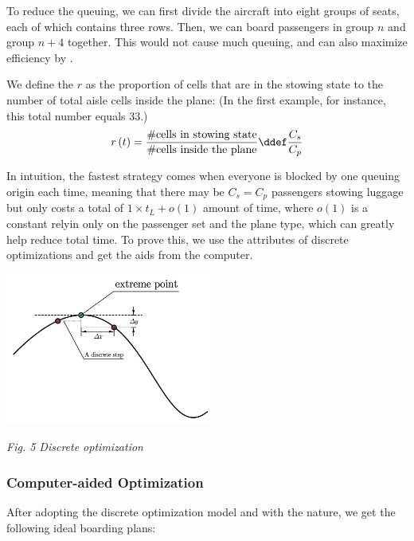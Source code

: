 \documentclass{article}
\theoremstyle{definition}
\theoremstyle{remark}
\numberwithin{equation}{section}
\begin{document}
	To reduce the queuing, we can first divide the aircraft into eight groups of seats, each of which contains three rows. Then, we can board passengers in group $n$ and group $n+4$ together. This would not cause much queuing, and can also maximize efficiency by .

	We define the  \(r\) as the proportion of cells that are in the stowing state to the number of total aisle cells inside the plane: (In the first example, for instance, this total number equals \(33\).)
	\[r\left(t\right) = \dfrac{\#\text{cells in stowing state}}{\#\text{cells inside the plane}}\ddef\dfrac{C_s}{C_p}\]

	In intuition, the fastest strategy comes when everyone is blocked by one queuing origin each time, meaning that there may be \(C_s=C_p\) passengers stowing luggage but only costs a total of \(1\times t_L+o\left(1\right)\) amount of time, where \(o(1)\) is a constant relyin only on the passenger set and the plane type, which can greatly help reduce total time. To prove this, we use the attributes of discrete optimizations and get the aids from the computer.
	\begin{center}
		\includegraphics[height = 5cm]{discrete optimization.jpg}

		\small\textit{Fig. 5 Discrete optimization}
	\end{center}

	\subsubsection{Computer-aided Optimization}
	After adopting the discrete optimization model and with the  nature, we get the following ideal boarding plans:
\end{document}
